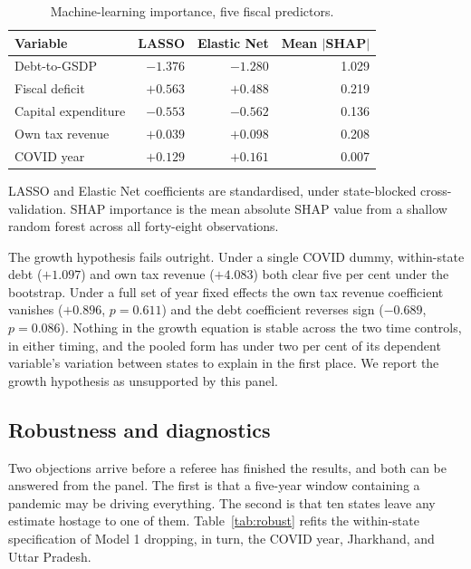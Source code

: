 \documentclass[12pt]{article}
\newcommand{\tnote}[1]{%
  \par\addvspace{4pt}%
  \begin{minipage}{0.92\textwidth}\footnotesize\raggedright #1\end{minipage}}
\begin{document}
\begin{table}[H]
\centering
\caption{Machine-learning importance, five fiscal predictors.}
\label{tab:ml}
\small
\begin{tabular}{@{}lrrr@{}}
\toprule
Variable & LASSO & Elastic Net & Mean $|$SHAP$|$ \\
\midrule
Debt-to-GSDP        & $-1.376$ & $-1.280$ & 1.029 \\
Fiscal deficit      & $+0.563$ & $+0.488$ & 0.219 \\
Capital expenditure & $-0.553$ & $-0.562$ & 0.136 \\
Own tax revenue     & $+0.039$ & $+0.098$ & 0.208 \\
COVID year          & $+0.129$ & $+0.161$ & 0.007 \\
\bottomrule
\end{tabular}
\tnote{LASSO and Elastic Net coefficients are standardised, under state-blocked
cross-validation. SHAP importance is the mean absolute SHAP value from a shallow
random forest across all forty-eight observations.}
\end{table}

The growth hypothesis fails outright. Under a single COVID dummy, within-state
debt ($+1.097$) and own tax revenue ($+4.083$) both clear five per cent under the
bootstrap. Under a full set of year fixed effects the own tax revenue coefficient
vanishes ($+0.896$, $p=0.611$) and the debt coefficient reverses sign ($-0.689$,
$p = 0.086$). Nothing in the growth equation is stable across the two time
controls, in either timing, and the pooled form has under two per cent of its
dependent variable's variation between states to explain in the first place. We
report the growth hypothesis as unsupported by this panel.

\subsection{Robustness and diagnostics}

Two objections arrive before a referee has finished the results, and both can be
answered from the panel. The first is that a five-year window containing a
pandemic may be driving everything. The second is that ten states leave any
estimate hostage to one of them. Table~\ref{tab:robust} refits the within-state
specification of Model 1 dropping, in turn, the COVID year, Jharkhand, and Uttar
Pradesh.
\end{document}
